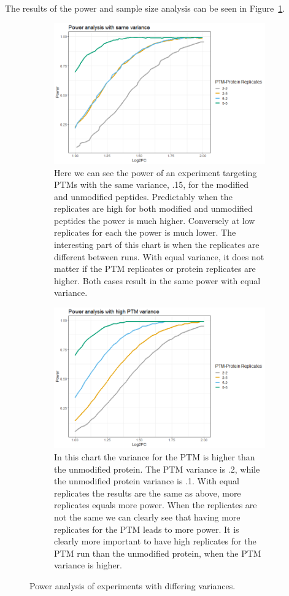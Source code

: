 \documentclass{mcp}
\def\sfigref#1{{Figure~\ref{#1}}}
\begin{document}
The results of the power and sample size analysis can be seen in \sfigref{fig:power_sd_combo}.

\begin{figure}[h!]
\centering
 \begin{subfigure}{\textwidth}
 \centering
	\includegraphics[width=.725\textwidth]{sim_new/same_var_power}
	\caption{Here we can see the power of an experiment targeting PTMs with the same variance, .15, for the modified and unmodified peptides. Predictably when the replicates are high for both modified and unmodified peptides the power is much higher. Conversely at low replicates for each the power is much lower. The interesting part of this chart is when the replicates are different between runs. With equal variance, it does not matter if the PTM replicates or protein replicates are higher. Both cases result in the same power with equal variance.}
 \end{subfigure}\vspace{-5mm}
 \begin{subfigure}{\textwidth}
 \centering
	\includegraphics[width=.725\textwidth]{sim_new/high_ptm_var_power}
	\caption{In this chart the variance for the PTM is higher than the unmodified protein. The PTM variance is .2, while the unmodified protein variance is .1. With equal replicates the results are the same as above, more replicates equals more power. When the replicates are not the same we can clearly see that having more replicates for the PTM leads to more power. It is clearly more important to have high replicates for the PTM run than the unmodified protein, when the PTM variance is higher.}
 \end{subfigure}
 \caption{Power analysis of experiments with differing variances.}
\label{fig:power_sd_combo}
\end{figure}
\end{document}
